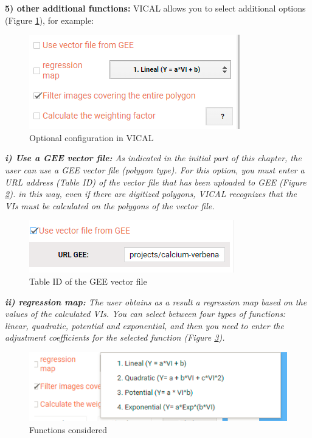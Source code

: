 \documentclass[
]{book}
\begin{document}
\textbf{5) other additional functions: } VICAL allows you to select additional options (Figure \ref{fig:figG6}), for example:

\begin{figure}

{\centering \includegraphics{./images/Figure9} 

}

\caption{Optional configuration in VICAL}\label{fig:figG6}
\end{figure}

\emph{\textbf{i) Use a GEE vector file:} As indicated in the initial part of this chapter, the user can use a GEE vector file (polygon type). For this option, you must enter a URL address (Table ID) of the vector file that has been uploaded to GEE (Figure \ref{fig:figG7}). in this way, even if there are digitized polygons, VICAL recognizes that the VIs must be calculated on the polygons of the vector file. }

\begin{figure}

{\centering \includegraphics{./images/Figure10} 

}

\caption{Table ID of the GEE vector file}\label{fig:figG7}
\end{figure}

\emph{\textbf{ii) regression map:} The user obtains as a result a regression map based on the values of the calculated VIs. You can select between four types of functions: linear, quadratic, potential and exponential, and then you need to enter the adjustment coefficients for the selected function (Figure \ref{fig:figG8}).}

\begin{figure}

{\centering \includegraphics{./images/Figure8} 

}

\caption{Functions considered}\label{fig:figG8}
\end{figure}
\end{document}
